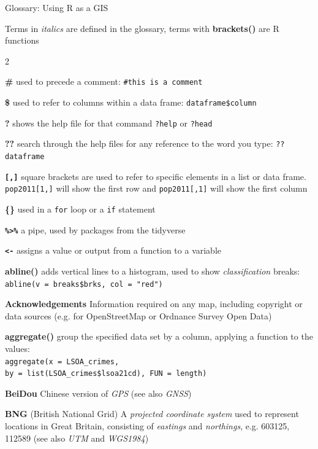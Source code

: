 \documentclass[a4paper,10pt]{article}
\begin{document}

\begin{center}

{\huge Glossary: Using R as a GIS}

Terms in \textit{italics} are defined in the glossary, terms with \textbf{brackets()} are R functions

\end{center}

\begin{multicols}{2}

\textbf{\#} used to precede a comment: \texttt{\#this is a comment}

\textbf{\$} used to refer to columns within a data frame: \texttt{dataframe\$column} 

\textbf{?} shows the help file for that command \texttt{?help} or \texttt{?head}

\textbf{??} search through the help files for any reference to the word you type: \texttt{??dataframe}

\textbf{\texttt{[,]}} square brackets are used to refer to specific elements in a list or data frame. \texttt{pop2011[1,]} will show the first row and \texttt{pop2011[,1]} will show the first column

\textbf{\{\}} used in a \texttt{for} loop or a \texttt{if} statement

\textbf{\texttt{\%>\%}} a pipe, used by packages from the tidyverse

\textbf{\texttt{<-}} assigns a value or output from a function to a variable

\textbf{abline()} adds vertical lines to a histogram, used to show \textit{classification} breaks: \texttt{abline(v = breaks\$brks, col = "red")}

\textbf{Acknowledgements} Information required on any map, including copyright or data sources  (e.g. for OpenStreetMap or Ordnance Survey Open Data)

\textbf{aggregate()} group the specified data set by a column, applying a function to the values:\\\texttt{aggregate(x = LSOA\_crimes,\\
by = list(LSOA\_crimes\$lsoa21cd), FUN = length)}

\textbf{BeiDou} Chinese version of \textit{GPS} (see also \textit{GNSS})

\textbf{BNG} (British National Grid) A \textit{projected coordinate system} used to represent locations in Great Britain, consisting of \textit{eastings} and \textit{northings}, e.g. 603125, 112589 (see also \textit{UTM} and \textit{WGS1984}) 


\end{multicols}
\end{document}
